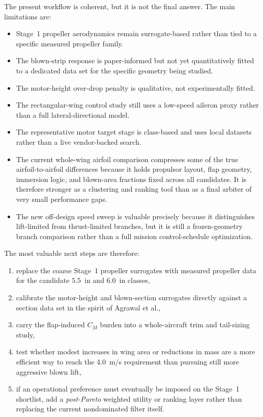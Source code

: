 \documentclass[conf]{new-aiaa}
\begin{document}
The present workflow is coherent, but it is not the final answer. The main limitations are:
\begin{itemize}
\item Stage~1 propeller aerodynamics remain surrogate-based rather than tied to a specific measured propeller family.
\item The blown-strip response is paper-informed but not yet quantitatively fitted to a dedicated data set for the specific geometry being studied.
\item The motor-height over-drop penalty is qualitative, not experimentally fitted.
\item The rectangular-wing control study still uses a low-speed aileron proxy rather than a full lateral-directional model.
\item The representative motor target stage is class-based and uses local datasets rather than a live vendor-backed search.
\item The current whole-wing airfoil comparison compresses some of the true airfoil-to-airfoil differences because it holds propulsor layout, flap geometry, immersion logic, and blown-area fractions fixed across all candidates. It is therefore stronger as a clustering and ranking tool than as a final arbiter of very small performance gaps.
\item The new off-design speed sweep is valuable precisely because it distinguishes lift-limited from thrust-limited branches, but it is still a frozen-geometry branch comparison rather than a full mission control-schedule optimization.
\end{itemize}

The most valuable next steps are therefore:
\begin{enumerate}
\item replace the coarse Stage~1 propeller surrogates with measured propeller data for the candidate \(5.5\)~in and \(6.0\)~in classes,
\item calibrate the motor-height and blown-section surrogates directly against a section data set in the spirit of Agrawal et al.,
\item carry the flap-induced \(C_M\) burden into a whole-aircraft trim and tail-sizing study,
\item test whether modest increases in wing area or reductions in mass are a more efficient way to reach the \SI{4.0}{m/s} requirement than pursuing still more aggressive blown lift,
\item if an operational preference must eventually be imposed on the Stage~1 shortlist, add a \emph{post-Pareto} weighted utility or ranking layer rather than replacing the current nondominated filter itself.
\end{enumerate}
\end{document}
